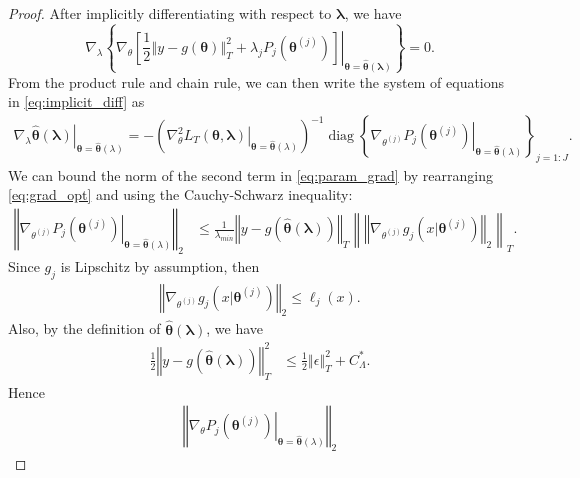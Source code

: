 \documentclass[10pt]{book}
\theoremstyle{definition}
\DeclareMathOperator{\diag}{diag}
\begin{document}
\begin{proof}
	After implicitly differentiating with respect to $\boldsymbol{\lambda}$, we have
	\begin{equation}
	\label{eq:implicit_diff}
	\nabla_{\lambda}\left\{ \left.\nabla_{\theta}
	\left [
	\frac{1}{2}\left\Vert y-g(\boldsymbol{\theta})\right\Vert _{T}^{2}+\lambda_{j}P_{j}(\boldsymbol{\theta}^{(j)})
	\right ]
	\right|_{\boldsymbol{\theta}=\hat{\boldsymbol{\theta}}(\boldsymbol{\lambda})}\right\} =0.
	\end{equation}
	From the product rule and chain rule, we can then write the system of equations in \eqref{eq:implicit_diff} as
	\begin{align}
	\label{eq:param_grad}
	\left . \nabla_{\lambda}\hat{\boldsymbol{\theta}}(\boldsymbol{\lambda})
	\right|_{\boldsymbol{\theta}=\hat{\boldsymbol{\theta}}(\lambda)}
	= -
	\left (
	\left.\nabla_{\theta}^2
	L_T(\boldsymbol{\theta}, \boldsymbol{\lambda})
	\right|_{\boldsymbol{\theta}=\hat{\boldsymbol{\theta}}(\lambda)} 
	\right)^{-1}
	\diag \left \{
	\left.
	\nabla_{\theta^{(j)}}P_{j}(\boldsymbol{\theta}^{(j)})
	\right|_{\boldsymbol{\theta}=\hat{\boldsymbol{\theta}}(\lambda)}
	\right \}_{j=1:J}
	.
	\end{align}
	We can bound the norm of the second term in \eqref{eq:param_grad} by rearranging \eqref{eq:grad_opt} and using the Cauchy-Schwarz inequality:
	\begin{align*}
		\left\Vert \left.\nabla_{\theta^{(j)}}P_{j}(\boldsymbol{\theta}^{(j)})\right|_{\boldsymbol{\theta}=\hat{\boldsymbol{\theta}}(\lambda)}\right\Vert_2
		&
		\le  \frac{1}{\lambda_{min}}\left\Vert y-g(\hat{\boldsymbol{\theta}}(\boldsymbol{\lambda}))\right\Vert _{T}
		\left \|
		\left\Vert
		\nabla_{\theta^{(j)}}g_{j}(x|\boldsymbol{\theta}^{(j)})
		\right\Vert_{2}
		\right \|_T.
	\end{align*}
	Since $g_j$ is Lipschitz by assumption, then
	\begin{align}
	\left\Vert
	\nabla_{\theta^{(j)}}g_{j}(x|\boldsymbol{\theta}^{(j)})
	\right\Vert_{2}
	\le \ell_j(x).
	\end{align}
	Also, by the definition of $\hat{\boldsymbol{\theta}}(\boldsymbol{\lambda})$, we have
	\begin{align}
	\frac{1}{2}\left\Vert y-g(\hat{\boldsymbol{\theta}}(\boldsymbol{\lambda}))\right\Vert _{T}^{2}
	& \le \frac{1}{2}\left\Vert \epsilon \right \Vert_T^2 + C^*_{\Lambda}.
	\end{align}
	Hence
	\begin{align}
	\left\Vert \left.\nabla_{\theta}P_{j}(\boldsymbol{\theta}^{(j)})\right|_{\boldsymbol{\theta}=\hat{\boldsymbol{\theta}}(\lambda)}\right\Vert_2

\end{align}
\end{proof}
\end{document}
